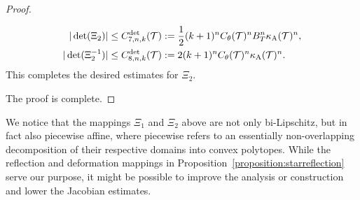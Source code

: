 \documentclass[10pt,a4paper]{article}
\begin{document}
\begin{proof}
\begin{itemize}
\begin{align*}
            |\det(\Xi_{2})|
            &\leq 
            C^{\det}_{7,n,k}({\mathcal T})
            :=
            \frac 1 2 
            (k+1)^{n}
            C_\theta({\mathcal T})^{n}
            B_{T}^{n}
            \kappa_{\rm A}({\mathcal T})^{n}
            ,
            \\
            |\det(\Xi_{2}^{-1})|
            &\leq 
            C^{\det}_{8,n,k}({\mathcal T})
            :=
            2
            (k+1)^{n}
            C_\theta({\mathcal T})^{n}
            \kappa_{\rm A}({\mathcal T})^{n}
            .
        \end{align*}
        This completes the desired estimates for $\Xi_{2}$. 
    \end{itemize}
    The proof is complete. 
\end{proof}
        

\begin{remark}
    We notice that the mappings $\Xi_{1}$ and $\Xi_{2}$ above are not only bi-Lipschitz, but in fact also piecewise affine, 
    where piecewise refers to an essentially non-overlapping decomposition of their respective domains into convex polytopes.
    While the reflection and deformation mappings in Proposition~\ref{proposition:starreflection} serve our purpose,
    it might be possible to improve the analysis or construction and lower the Jacobian estimates. 
\end{remark}



        
        
        
        





        
        
        
        
\end{document}
